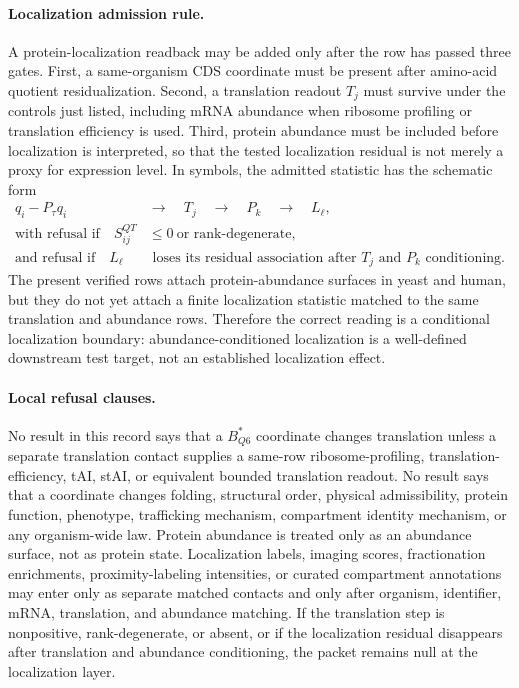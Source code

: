 \paragraph{Localization admission rule.}
A protein-localization readback may be added only after the row has passed three gates. First, a same-organism CDS coordinate must be present after amino-acid quotient residualization. Second, a translation readout $T_j$ must survive under the controls just listed, including mRNA abundance when ribosome profiling or translation efficiency is used. Third, protein abundance must be included before localization is interpreted, so that the tested localization residual is not merely a proxy for expression level. In symbols, the admitted statistic has the schematic form
$$
\begin{aligned}
q_i-P_{\tau}q_i\quad &\longrightarrow\quad T_j\quad \longrightarrow\quad P_k\quad \longrightarrow\quad L_\ell,\\
\text{with refusal if}\quad S^{QT}_{ij}&\leq 0\ \text{or rank-degenerate},\\
\text{and refusal if}\quad L_\ell&\text{ loses its residual association after }T_j\text{ and }P_k\text{ conditioning}.
\end{aligned}
$$
The present verified rows attach protein-abundance surfaces in yeast and human, but they do not yet attach a finite localization statistic matched to the same translation and abundance rows. Therefore the correct reading is a conditional localization boundary: abundance-conditioned localization is a well-defined downstream test target, not an established localization effect.

\paragraph{Local refusal clauses.}
No result in this record says that a $B^{*}_{Q6}$ coordinate changes translation unless a separate translation contact supplies a same-row ribosome-profiling, translation-efficiency, tAI, stAI, or equivalent bounded translation readout. No result says that a coordinate changes folding, structural order, physical admissibility, protein function, phenotype, trafficking mechanism, compartment identity mechanism, or any organism-wide law. Protein abundance is treated only as an abundance surface, not as protein state. Localization labels, imaging scores, fractionation enrichments, proximity-labeling intensities, or curated compartment annotations may enter only as separate matched contacts and only after organism, identifier, mRNA, translation, and abundance matching. If the translation step is nonpositive, rank-degenerate, or absent, or if the localization residual disappears after translation and abundance conditioning, the packet remains null at the localization layer.
